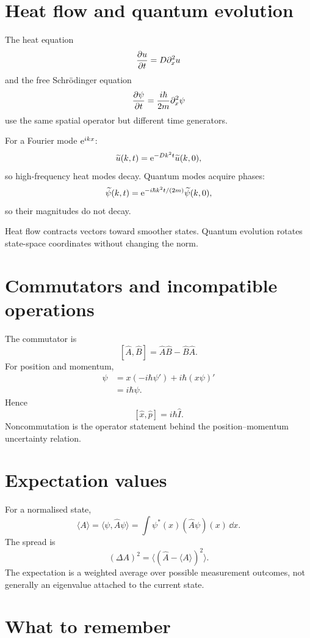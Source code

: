\documentclass[11pt,a4paper]{article}
\begin{document}
\section{Heat flow and quantum evolution}

The heat equation
\[
\frac{\partial u}{\partial t}=D\partial_x^2u
\]
and the free Schr\"odinger equation
\[
\frac{\partial \psi}{\partial t}=\frac{i\hbar}{2m}\partial_x^2\psi
\]
use the same spatial operator but different time generators.

For a Fourier mode $\mathrm e^{ikx}$:
\[
\widetilde u(k,t)=\mathrm e^{-Dk^2t}\widetilde u(k,0),
\]
so high-frequency heat modes decay. Quantum modes acquire phases:
\[
\widetilde\psi(k,t)=\mathrm e^{-i\hbar k^2t/(2m)}\widetilde\psi(k,0),
\]
so their magnitudes do not decay.

\begin{resultbox}
Heat flow contracts vectors toward smoother states. Quantum evolution rotates state-space coordinates without changing the norm.
\end{resultbox}

\section{Commutators and incompatible operations}

The commutator is
\[
[\widehat A,\widehat B]=\widehat A\widehat B-\widehat B\widehat A.
\]
For position and momentum,
\begin{align*}
[\widehat x,\widehat p]\psi
&=x(-i\hbar\psi')+i\hbar(x\psi)'\\
&=i\hbar\psi.
\end{align*}
Hence
\[
\boxed{[\widehat x,\widehat p]=i\hbar\widehat I.}
\]
Noncommutation is the operator statement behind the position--momentum uncertainty relation.

\section{Expectation values}

For a normalised state,
\[
\boxed{\langle A\rangle
=\langle\psi,\widehat A\psi\rangle
=\int\psi^*(x)(\widehat A\psi)(x)\,\dd x.}
\]
The spread is
\[
(\Delta A)^2=\langle(\widehat A-\langle A\rangle)^2\rangle.
\]
The expectation is a weighted average over possible measurement outcomes, not generally an eigenvalue attached to the current state.

\section{What to remember}
\end{document}
